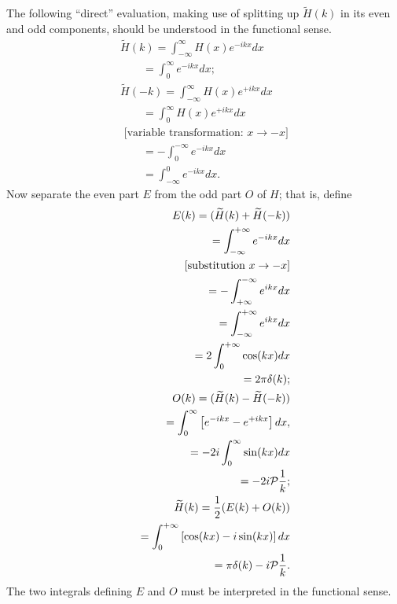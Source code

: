 {\color{OliveGreen}
\bproof
The following ``direct'' evaluation, making use of splitting up $\widetilde{H}(k)$ in its even and odd components,
should be understood in the  functional sense.
\begin{equation}
\begin{split}
 \widetilde{H}(k)
=   \int_{-\infty}^\infty  H(x) e^{-i{kx}} dx   \\
\qquad
=   \int_{0}^\infty   e^{-i{kx}} dx
;   \\
 \widetilde{H}(-k)
=   \int_{-\infty}^\infty  H(x) e^{+i{kx}} dx   \\
\qquad
=   \int_{0}^\infty  H(x) e^{+i{kx}} dx   \\
\textrm{ [variable transformation: }x\rightarrow -x \textrm{]}  \\
\qquad
=  - \int_0^{-\infty} e^{-i{kx}} dx   \\
\qquad
=   \int_{-\infty}^0 e^{-i{kx}} dx
.
\end{split}
\end{equation}
Now separate the even part $E$ from the odd part $O$ of $H$; that is, define
\begin{equation}
\begin{split}
E(k) = (\widetilde{H}(k) + \widetilde{H}(-k))\\
\qquad =   \int_{-\infty}^{+\infty} e^{-i{kx}} dx      \\
\qquad \; [\textrm{substitution } x\rightarrow -x]\\
\qquad =   -\int_{+\infty}^{-\infty} e^{ i{kx}} dx      \\
\qquad =    \int_{-\infty}^{+\infty} e^{ i{kx}} dx      \\
\qquad =    2\int_{0}^{+\infty} \cos (kx) dx      \\
\qquad =   2\pi \delta(k);      \\
O(k) = (\widetilde{H}(k) - \widetilde{H}(-k))\\
\qquad =   \int_{0}^\infty \left[  e^{-i{kx}}- e^{+i{kx}}\right]  dx ,   \\
\qquad =   -2 i \int_{0}^\infty \sin (kx)  dx    \\
\qquad =   - 2 i {\cal P} \frac{1}{k} ;    \\
\widetilde{H}(k) = \frac{1}{2}(E(k)+O(k)) \\
\qquad =     \int_{0}^{+\infty} \left[ \cos (kx) - i\sin (kx) \right] dx  \\
\qquad =    \pi \delta (k) - i{\cal P}\frac{1}{k}
.
\end{split}
\end{equation}
The two integrals defining $E$ and $O$
must be interpreted in the functional sense.




\eproof
}
